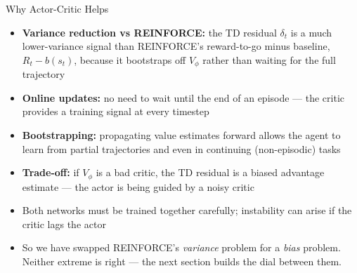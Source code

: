 \begin{frame}{Why Actor-Critic Helps}
\begin{itemize}
    \item \textbf{Variance reduction vs REINFORCE:} the TD residual $\delta_t$ is a much lower-variance signal than REINFORCE's reward-to-go minus baseline, $R_t - b(s_t)$, because it bootstraps off $V_\phi$ rather than waiting for the full trajectory
    \item \textbf{Online updates:} no need to wait until the end of an episode --- the critic provides a training signal at every timestep
    \item \textbf{Bootstrapping:} propagating value estimates forward allows the agent to learn from partial trajectories and even in continuing (non-episodic) tasks
    \pause
    \item \textbf{Trade-off:} if $V_\phi$ is a bad critic, the TD residual is a biased advantage estimate --- the actor is being guided by a noisy critic
    \item Both networks must be trained together carefully; instability can arise if the critic lags the actor
    \item[$\Rightarrow$] So we have swapped REINFORCE's \emph{variance} problem for a \emph{bias} problem. Neither extreme is right --- the next section builds the dial between them.
\end{itemize}
\end{frame}

